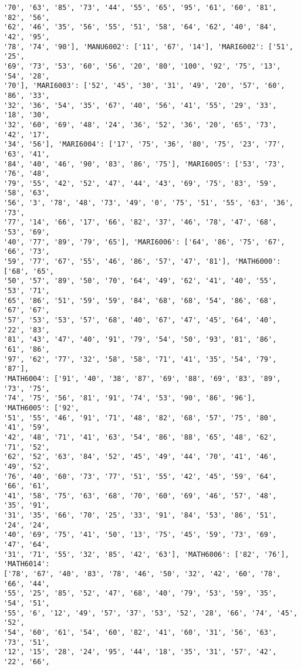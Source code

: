 \documentclass[11pt]{article}
\begin{document}
\begin{Verbatim}[commandchars=\\\{\}]
'70', '63', '85', '73', '44', '55', '65', '95', '61', '60', '81', '82', '56',
'62', '46', '35', '56', '55', '51', '58', '64', '62', '40', '84', '42', '95',
'78', '74', '90'], 'MANU6002': ['11', '67', '14'], 'MARI6002': ['51', '25',
'69', '73', '53', '60', '56', '20', '80', '100', '92', '75', '13', '54', '28',
'70'], 'MARI6003': ['52', '45', '30', '31', '49', '20', '57', '60', '86', '33',
'32', '36', '54', '35', '67', '40', '56', '41', '55', '29', '33', '18', '30',
'32', '60', '69', '48', '24', '36', '52', '36', '20', '65', '73', '42', '17',
'34', '56'], 'MARI6004': ['17', '75', '36', '80', '75', '23', '77', '63', '41',
'84', '40', '46', '90', '83', '86', '75'], 'MARI6005': ['53', '73', '76', '48',
'79', '55', '42', '52', '47', '44', '43', '69', '75', '83', '59', '58', '63',
'56', '3', '78', '48', '73', '49', '0', '75', '51', '55', '63', '36', '73',
'77', '14', '66', '17', '66', '82', '37', '46', '78', '47', '68', '53', '69',
'40', '77', '89', '79', '65'], 'MARI6006': ['64', '86', '75', '67', '66', '73',
'59', '77', '67', '55', '46', '86', '57', '47', '81'], 'MATH6000': ['68', '65',
'50', '57', '89', '50', '70', '64', '49', '62', '41', '40', '55', '53', '71',
'65', '86', '51', '59', '59', '84', '68', '68', '54', '86', '68', '67', '67',
'57', '53', '53', '57', '68', '40', '67', '47', '45', '64', '40', '22', '83',
'81', '43', '47', '40', '91', '79', '54', '50', '93', '81', '86', '61', '86',
'97', '62', '77', '32', '58', '58', '71', '41', '35', '54', '79', '87'],
'MATH6004': ['91', '40', '38', '87', '69', '88', '69', '83', '89', '73', '75',
'74', '75', '56', '81', '91', '74', '53', '90', '86', '96'], 'MATH6005': ['92',
'51', '55', '46', '91', '71', '48', '82', '68', '57', '75', '80', '41', '59',
'42', '48', '71', '41', '63', '54', '86', '88', '65', '48', '62', '71', '52',
'62', '52', '63', '84', '52', '45', '49', '44', '70', '41', '46', '49', '52',
'76', '40', '60', '73', '77', '51', '55', '42', '45', '59', '64', '66', '61',
'41', '58', '75', '63', '68', '70', '60', '69', '46', '57', '48', '35', '91',
'31', '35', '66', '70', '25', '33', '91', '84', '53', '86', '51', '24', '24',
'40', '69', '75', '41', '50', '13', '75', '45', '59', '73', '69', '47', '64',
'31', '71', '55', '32', '85', '42', '63'], 'MATH6006': ['82', '76'], 'MATH6014':
['78', '67', '40', '83', '78', '46', '50', '32', '42', '60', '78', '66', '44',
'55', '25', '85', '52', '47', '68', '40', '79', '53', '59', '35', '54', '51',
'55', '6', '12', '49', '57', '37', '53', '52', '28', '66', '74', '45', '52',
'54', '60', '61', '54', '60', '82', '41', '60', '31', '56', '63', '73', '51',
'12', '15', '28', '24', '95', '44', '18', '35', '31', '57', '42', '22', '66',

\end{Verbatim}
\end{document}
